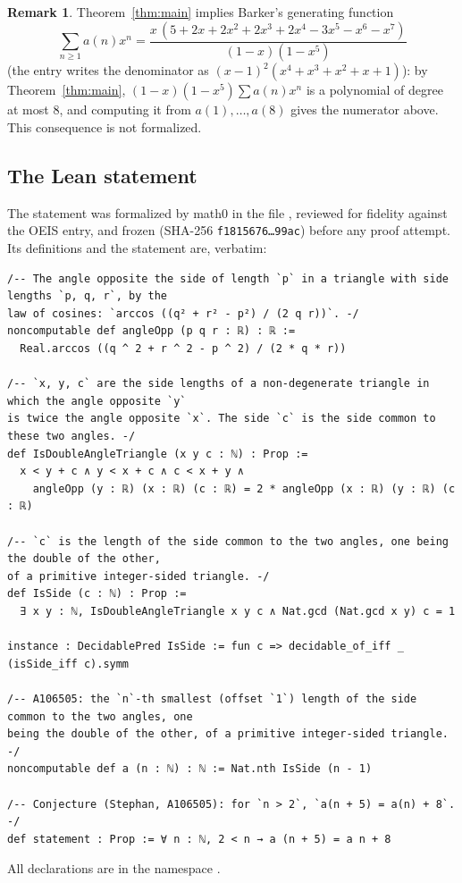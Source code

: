 \documentclass[11pt]{amsart}
\theoremstyle{plain}
\theoremstyle{definition}
\newtheorem{remark}[theorem]{Remark}
\begin{document}
\begin{remark}\label{rem:gf}
Theorem~\ref{thm:main} implies Barker's generating function
\[
  \sum_{n\ge1}a(n)x^n=\frac{x\,(5+2x+2x^2+2x^3+2x^4-3x^5-x^6-x^7)}{(1-x)(1-x^5)}
\]
(the entry writes the denominator as $(x-1)^2(x^4+x^3+x^2+x+1)$): by Theorem~\ref{thm:main}, $(1-x)(1-x^5)\sum a(n)x^n$ is a polynomial of degree at most $8$, and computing it from $a(1),\dots,a(8)$ gives the numerator above. This consequence is not formalized.
\end{remark}

\subsection*{The Lean statement}
The statement was formalized by math0 in the file , reviewed for fidelity against the OEIS entry, and frozen (SHA-256 \texttt{f1815676\ldots99ac}) before any proof attempt. Its definitions and the statement are, verbatim:
\begin{lstlisting}[basicstyle=\ttfamily\scriptsize]
/-- The angle opposite the side of length `p` in a triangle with side lengths `p, q, r`, by the
law of cosines: `arccos ((q² + r² - p²) / (2 q r))`. -/
noncomputable def angleOpp (p q r : ℝ) : ℝ :=
  Real.arccos ((q ^ 2 + r ^ 2 - p ^ 2) / (2 * q * r))

/-- `x, y, c` are the side lengths of a non-degenerate triangle in which the angle opposite `y`
is twice the angle opposite `x`. The side `c` is the side common to these two angles. -/
def IsDoubleAngleTriangle (x y c : ℕ) : Prop :=
  x < y + c ∧ y < x + c ∧ c < x + y ∧
    angleOpp (y : ℝ) (x : ℝ) (c : ℝ) = 2 * angleOpp (x : ℝ) (y : ℝ) (c : ℝ)

/-- `c` is the length of the side common to the two angles, one being the double of the other,
of a primitive integer-sided triangle. -/
def IsSide (c : ℕ) : Prop :=
  ∃ x y : ℕ, IsDoubleAngleTriangle x y c ∧ Nat.gcd (Nat.gcd x y) c = 1

instance : DecidablePred IsSide := fun c => decidable_of_iff _ (isSide_iff c).symm

/-- A106505: the `n`-th smallest (offset `1`) length of the side common to the two angles, one
being the double of the other, of a primitive integer-sided triangle. -/
noncomputable def a (n : ℕ) : ℕ := Nat.nth IsSide (n - 1)

/-- Conjecture (Stephan, A106505): for `n > 2`, `a(n + 5) = a(n) + 8`. -/
def statement : Prop := ∀ n : ℕ, 2 < n → a (n + 5) = a n + 8
\end{lstlisting}
All declarations are in the namespace .
\end{document}
